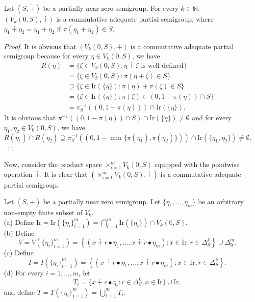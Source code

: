 \documentclass[twoside,11pt]{article}
\begin{document}
\begin{theorem}
	Let $(S,\dot{+})$ be a partially near zero semigroup. For every $k\in\mathbb{N}$, $(V_k(0,S),\dotplus)$ is a commutative adequate partial semigroup, where $\eta_1 \dotplus \eta_2 = \eta_1 + \eta_2$ if $\pi(\eta_1 + \eta_2)\in S$.
\end{theorem}
\begin{proof}
	It is obvious that $(V_k(0,S),\dotplus)$ is a commutative adequate partial semigroup because for every $\eta\in V_k(0,S)$, we have 
	\begin{align*}
	R(\eta) &= \{\zeta\in V_k(0,S) : \eta \dotplus \zeta \text{ is well defined} \} \\
	&= \{\zeta\in V_k(0,S) : \pi(\eta + \zeta)\in S \} \\
	&\supseteq \{\zeta\in \mathrm{Ir}(\{\eta\}) : \pi(\eta) + \pi(\zeta)\in S \} \\
	&= \{\zeta\in \mathrm{Ir}(\{\eta\}) : \pi(\zeta)\in (0,1-\pi(\eta)) \cap S \} \\
	&= \pi_S^{-1}((0,1-\pi(\eta))) \cap \mathrm{Ir}(\{\eta\}).
	\end{align*}
	It is obvious that $\pi^{-1}((0,1-\pi(\eta)) \cap S) \cap \mathrm{Ir}(\{\eta\}) \neq \emptyset$ and for every $\eta_1,\eta_2\in V_k(0,S)$, we have 
	\[
	R({\eta_1}) \cap R({\eta_2}) \supseteq \pi_S^{-1}((0,1-\min\{\pi(\eta_1),\pi(\eta_2)\})) \cap \mathrm{Ir}(\{\eta_1,\eta_2\}) \neq \emptyset.
	\]
\end{proof}


Now, consider the product space $\times_{i=1}^m V_k(0,S)$ equipped with the pointwise operation $\dotplus$. It is clear that $\left(\times_{i=1}^m V_k(0,S), \dotplus\right)$ is a commutative adequate partial semigroup.

\begin{definition}
	Let $(S,\dot{+})$ be a partially near zero semigroup. Let $\{\eta_1,\ldots,\eta_m\}$ be an arbitrary non-empty finite subset of $V_k$.\\
	(a) Define $\mathrm{Ir} = \mathrm{Ir}(\{\eta_i\}_{i=1}^m) = \bigcap_{i=1}^m \mathrm{Ir}(\{\eta_i\}) \cap V_k(0,S)$.\\
	(b) Define 
	\[
	V = V(\{\eta_i\}_{i=1}^m) = \left\{ \left(x \dotplus r \bullet \eta_1, \ldots, x \dotplus r \bullet \eta_m \right) : x \in \mathrm{Ir}, r \in \Delta_S^k \right\} \cup \Delta_{\mathrm{Ir}}^m.
	\]
	(c) Define 
	\[
	I = I(\{\eta_i\}_{i=1}^m) = \left\{ \left(x \dotplus r \bullet \eta_1, \ldots, x \dotplus r \bullet \eta_m \right) : x \in \mathrm{Ir}, r \in \Delta_S^k \right\}.
	\]
	(d) For every $i=1,\ldots,m$, let
	\[
	T_i = \{x \dotplus r \bullet \eta_i : r \in \Delta_S^k, x \in \mathrm{Ir}\} \cup \mathrm{Ir}, 
	\]
	and define $T = T(\{\eta_i\}_{i=1}^m) = \bigcup_{i=1}^m T_i$.
\end{definition}
\end{document}
